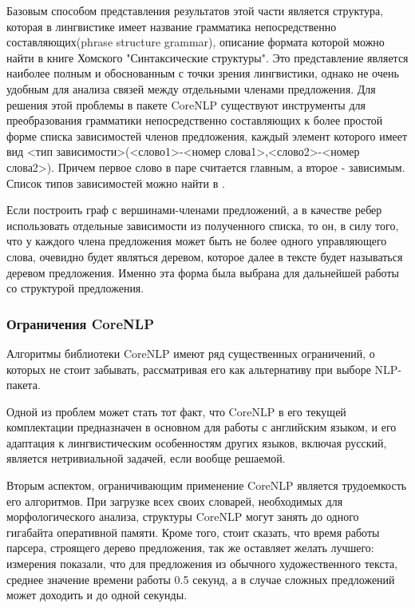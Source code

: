 Базовым способом представления результатов этой части является структура,
которая в лингвистике имеет название грамматика непосредственно составляющих(phrase structure grammar), 
описание формата которой можно найти в книге Хомского "Синтаксические структуры"\cite{homsky}.
Это представление является наиболее полным и обоснованным с точки зрения лингвистики, 
однако не очень удобным для анализа связей между отдельными членами предложения.
Для решения этой проблемы в пакете CoreNLP существуют инструменты для 
преобразования грамматики непосредственно составляющих к более простой форме
списка зависимостей членов предложения, каждый элемент которого имеет вид 
<тип зависимости>(<слово1>-<номер слова1>,<слово2>-<номер слова2>).
Причем первое слово в паре считается главным, а второе - зависимым.
Список типов зависимостей можно найти в \cite{dependencies}.

Если построить граф с вершинами-членами предложений, а в качестве ребер использовать 
отдельные зависимости из полученного списка, то он, в силу того, что у каждого члена
предложения может быть не более одного управляющего слова, очевидно будет
являться деревом, которое далее в тексте будет называться деревом предложения.
Именно эта форма была выбрана для дальнейшей работы со структурой
предложения.


\subsubsection{Ограничения CoreNLP}

Алгоритмы библиотеки CoreNLP имеют ряд существенных ограничений, 
о которых не стоит забывать, рассматривая его как альтернативу
при выборе NLP-пакета.

Одной из проблем может стать тот факт, что CoreNLP в его текущей комплектации
предназначен в основном для работы с английским языком, 
и его адаптация к лингвистическим особенностям других языков, включая русский,
является нетривиальной задачей, если вообще решаемой.

Вторым аспектом, ограничивающим применение CoreNLP является трудоемкость
его алгоритмов. При загрузке всех своих словарей, необходимых для морфологического
анализа, структуры CoreNLP могут занять до одного гигабайта оперативной памяти.
Кроме того, стоит сказать, что время работы парсера, строящего дерево предложения,
так же оставляет желать лучшего: измерения показали, что для предложения
из обычного художественного текста, среднее значение времени работы 0.5 секунд,
а в случае сложных предложений может доходить и до одной секунды.

